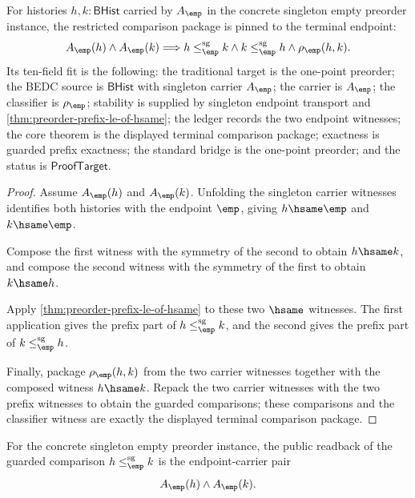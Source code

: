 \begin{theorem}
\label{thm:preorder-singleton-empty-terminal-comparison-package}
For histories $h,k:\mathsf{BHist}$ carried by $A_{\emp}$ in the concrete
singleton empty preorder instance, the restricted comparison package is pinned
to the terminal endpoint:
$$
A_{\emp}(h)\land A_{\emp}(k)
\Longrightarrow
h\le_{\emp}^{\mathrm{sg}}k\land k\le_{\emp}^{\mathrm{sg}}h\land
\rho_{\emp}(h,k).
$$
Its ten-field fit is the following: the traditional target is the one-point
preorder; the BEDC source is $\mathsf{BHist}$ with singleton carrier
$A_{\emp}$; the carrier is $A_{\emp}$; the classifier is $\rho_{\emp}$;
stability is supplied by singleton endpoint transport and
\autoref{thm:preorder-prefix-le-of-hsame}; the ledger records the two endpoint
witnesses; the core theorem is the displayed terminal comparison package;
exactness is guarded prefix exactness; the standard bridge is the one-point
preorder; and the status is $\mathsf{ProofTarget}$.
\end{theorem}
\begin{proof}
Assume $A_{\emp}(h)$ and $A_{\emp}(k)$. Unfolding the singleton carrier
witnesses identifies both histories with the endpoint $\emp$, giving
$h\hsame\emp$ and $k\hsame\emp$.

Compose the first witness with the symmetry of the second to obtain
$h\hsame k$, and compose the second witness with the symmetry of the first to
obtain $k\hsame h$.

Apply \autoref{thm:preorder-prefix-le-of-hsame} to these two $\hsame$ witnesses.
The first application gives the prefix part of
$h\le_{\emp}^{\mathrm{sg}}k$, and the second gives the prefix part of
$k\le_{\emp}^{\mathrm{sg}}h$.

Finally, package $\rho_{\emp}(h,k)$ from the two carrier witnesses together
with the composed witness $h\hsame k$. Repack the two carrier witnesses with
the two prefix witnesses to obtain the guarded comparisons; these comparisons
and the classifier witness are exactly the displayed terminal comparison
package.
\end{proof}

\begin{definition}
\label{def:preorder-singleton-empty-public-comparison-readback}
For the concrete singleton empty preorder instance, the public readback of
the guarded comparison $h\le_{\emp}^{\mathrm{sg}}k$ is the endpoint-carrier
pair
$$
A_{\emp}(h)\land A_{\emp}(k).
$$
\end{definition}


